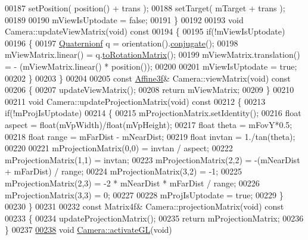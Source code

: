 \begin{DoxyCode}
00187   setPosition( position() + trans );
00188   setTarget( mTarget + trans );
00189 
00190   mViewIsUptodate = \textcolor{keyword}{false};
00191 \}
00192 
00193 \textcolor{keywordtype}{void} Camera::updateViewMatrix(\textcolor{keywordtype}{void})\textcolor{keyword}{ const}
00194 \textcolor{keyword}{}\{
00195     \textcolor{keywordflow}{if}(!mViewIsUptodate)
00196     \{
00197         \hyperlink{group___geometry___module_class_eigen_1_1_quaternion}{Quaternionf} q = orientation().\hyperlink{group___geometry___module_aa82dabadce488031c298a5a0a92cda14}{conjugate}();
00198         mViewMatrix.linear() = q.\hyperlink{group___geometry___module_a621c71eec9680bf77342b28a473b6874}{toRotationMatrix}();
00199         mViewMatrix.translation() = - (mViewMatrix.linear() * position());
00200 
00201         mViewIsUptodate = \textcolor{keyword}{true};
00202     \}
00203 \}
00204 
00205 \textcolor{keyword}{const} \hyperlink{group___geometry___module_class_eigen_1_1_transform}{Affine3f}& Camera::viewMatrix(\textcolor{keywordtype}{void})\textcolor{keyword}{ const}
00206 \textcolor{keyword}{}\{
00207   updateViewMatrix();
00208   \textcolor{keywordflow}{return} mViewMatrix;
00209 \}
00210 
00211 \textcolor{keywordtype}{void} Camera::updateProjectionMatrix(\textcolor{keywordtype}{void})\textcolor{keyword}{ const}
00212 \textcolor{keyword}{}\{
00213   \textcolor{keywordflow}{if}(!mProjIsUptodate)
00214   \{
00215     mProjectionMatrix.setIdentity();
00216     \textcolor{keywordtype}{float} aspect = float(mVpWidth)/float(mVpHeight);
00217     \textcolor{keywordtype}{float} theta = mFovY*0.5;
00218     \textcolor{keywordtype}{float} range = mFarDist - mNearDist;
00219     \textcolor{keywordtype}{float} invtan = 1./tan(theta);
00220 
00221     mProjectionMatrix(0,0) = invtan / aspect;
00222     mProjectionMatrix(1,1) = invtan;
00223     mProjectionMatrix(2,2) = -(mNearDist + mFarDist) / range;
00224     mProjectionMatrix(3,2) = -1;
00225     mProjectionMatrix(2,3) = -2 * mNearDist * mFarDist / range;
00226     mProjectionMatrix(3,3) = 0;
00227     
00228     mProjIsUptodate = \textcolor{keyword}{true};
00229   \}
00230 \}
00231 
00232 \textcolor{keyword}{const} Matrix4f& Camera::projectionMatrix(\textcolor{keywordtype}{void})\textcolor{keyword}{ const}
00233 \textcolor{keyword}{}\{
00234   updateProjectionMatrix();
00235   \textcolor{keywordflow}{return} mProjectionMatrix;
00236 \}
00237 
\hyperlink{class_camera_a4872379b01876af2ffd8d2d871472ed1}{00238} \textcolor{keywordtype}{void} \hyperlink{class_camera_a4872379b01876af2ffd8d2d871472ed1}{Camera::activateGL}(\textcolor{keywordtype}{void})

\end{DoxyCode}
